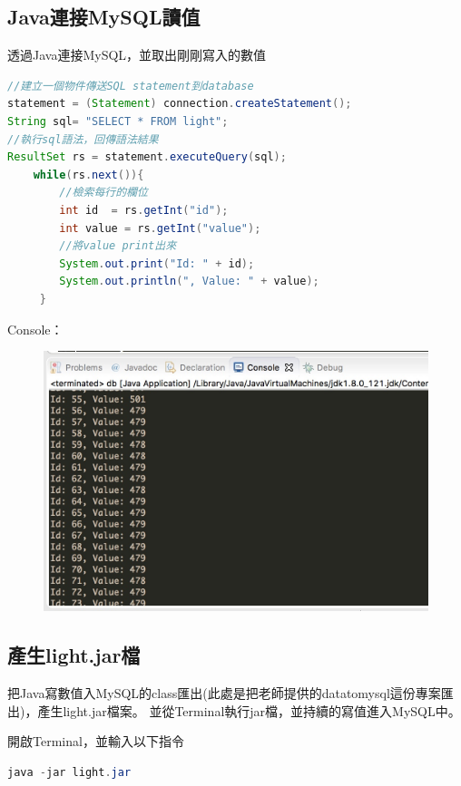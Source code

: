 \documentclass[12pt,a4paper]{article}
\begin{document}
{\subsection{Java連接MySQL讀值}
透過Java連接MySQL，並取出剛剛寫入的數值
\begin{shaded}
\begin{lstlisting}[language=Java]
//建立一個物件傳送SQL statement到database
statement = (Statement) connection.createStatement();
String sql= "SELECT * FROM light";
//執行sql語法，回傳語法結果
ResultSet rs = statement.executeQuery(sql);
	while(rs.next()){
	    //檢索每行的欄位
	    int id  = rs.getInt("id");
	    int value = rs.getInt("value");
	    //將value print出來
	    System.out.print("Id: " + id);
	    System.out.println(", Value: " + value);
	 }
\end{lstlisting}
\end{shaded}

\newpage
Console：
\begin{figure}[ht]
\centering
\includegraphics[width=1.0\textwidth]{image/mysqldata.jpg}
\end{figure}

\subsection{產生light.jar檔}
把Java寫數值入MySQL的class匯出(此處是把老師提供的datatomysql這份專案匯出)，產生light.jar檔案。
並從Terminal執行jar檔，並持續的寫值進入MySQL中。

開啟Terminal，並輸入以下指令
\begin{shaded}
\begin{lstlisting}[language=Java]
java -jar light.jar
\end{lstlisting}
\end{shaded}

}
\end{document}
